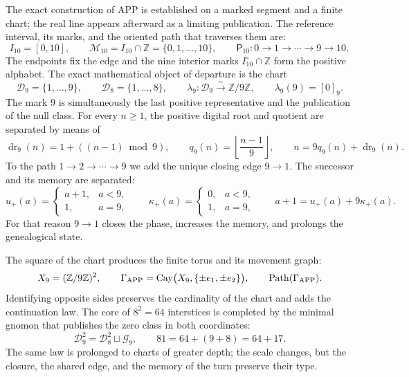 The exact construction of APP is established on a marked segment and a
finite chart; the real line appears afterward as a limiting publication. The
reference interval, its marks, and the oriented path that traverses them are:
\begin{equation}
I_{10}=[0,10],\qquad
\mathcal M_{10}=I_{10}\cap\mathbb Z=\{0,1,\ldots,10\},
\qquad
\mathsf P_{10}:0\longrightarrow1\longrightarrow\cdots
\longrightarrow9\longrightarrow10,
\label{p12-83-c3-s1:eq:app-marked-segment}
\end{equation}
The endpoints fix the edge and the nine interior marks
\(I_{10}^{\circ}\cap\mathbb Z\) form the positive alphabet. The exact
mathematical object of departure is the chart
\begin{equation}
\mathcal D_9=\{1,\ldots,9\},
\qquad \mathcal D_8=\{1,\ldots,8\},
\qquad
\lambda_9:\mathcal D_9\xrightarrow{\sim}\mathbb Z/9\mathbb Z,
\qquad \lambda_9(9)=[0]_9.
\label{p12-83-c3-s1:eq:app-positive-chart}
\end{equation}
The mark \(9\) is simultaneously the last positive representative and the
publication of the null class. For every \(n\geq1\), the positive digital root and
quotient are separated by means of
\begin{equation}
\operatorname{dr}_9(n)=1+((n-1)\bmod9),
\qquad q_9(n)=\left\lfloor\frac{n-1}{9}\right\rfloor,
\qquad n=9q_9(n)+\operatorname{dr}_9(n).
\label{p12-83-c3-s1:eq:positive-digital-root-carry}
\end{equation}
To the path \(1\to2\to\cdots\to9\) we add the unique closing edge \(9\to1\). The successor and its memory are separated:
\begin{equation}
u_+(a)=\begin{cases}a+1,&a<9,\\1,&a=9,\end{cases}
\qquad
\kappa_+(a)=\begin{cases}0,&a<9,\\1,&a=9,\end{cases}
\qquad a+1=u_+(a)+9\kappa_+(a).
\label{p12-83-c3-s1:eq:app-successor-carry}
\end{equation}
For that reason \(9\to1\) closes the phase, increases the memory, and prolongs the
genealogical state.

The square of the chart produces the finite torus and its movement graph:
\begin{equation}
X_9=(\mathbb Z/9\mathbb Z)^2,
\qquad
\Gamma_{\rm APP}=\operatorname{Cay}
\bigl(X_9,\{\pm e_1,\pm e_2\}\bigr),
\qquad
\operatorname{Path}(\Gamma_{\rm APP}).
\label{p12-83-c3-s1:eq:app-cayley-torus}
\end{equation}
Identifying opposite sides preserves the cardinality of the chart and adds the continuation law. The core of \(8^2=64\) interstices is completed by the minimal gnomon that publishes the zero class in both coordinates:
\begin{equation}
\mathcal D_9^2=\mathcal D_8^2\sqcup\mathcal G_9,
\qquad
81=64+(9+8)=64+17.
\label{p12-83-c3-s1:eq:app-gnomon-public}
\end{equation}
The same law is prolonged to charts of greater depth; the scale changes,
but the closure, the shared edge, and the memory of the turn preserve their type.

